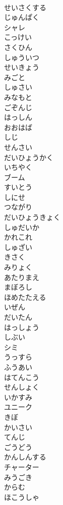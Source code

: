 \documentclass[8pt]{extreport}
\begin{document}
\begin{CJK}{UTF8}{min}
\\	せいさくする
\\	じゅんぱく
\\	シャレ
\\	こっけい
\\	さくひん
\\	しゅういつ
\\	せいきょう
\\	みごと
\\	しゅさい
\\	みなもと
\\	ごぞんじ
\\	はっしん
\\	おおはば
\\	しじ
\\	せんさい
\\	だいひょうかく
\\	いちやく
\\	ブーム
\\	すいとう
\\	しにせ
\\	つながり
\\	だいひょうきょく
\\	しゅだいか
\\	かれこれ
\\	しゅざい
\\	きさく
\\	みりょく
\\	あたりまえ
\\	まぼろし
\\	ほめたたえる
\\	いぜん
\\	だいたん
\\	はっしょう
\\	しぶい
\\	シミ
\\	うっすら
\\	ふうあい
\\	はてんこう
\\	せんしょく
\\	いかすみ
\\	ユニーク
\\	きぼ
\\	かいさい
\\	てんじ
\\	ごうどう
\\	かんしんする
\\	チャーター
\\	みうごき
\\	からむ
\\	ほこうしゃ

\end{CJK}
\end{document}

